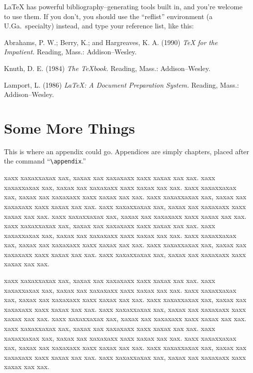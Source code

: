 
LaTeX has powerful bibliography--generating tools built in, and you're 
welcome to use them.  If you don't, you should use the ``reflist'' 
environment (a U.Ga.\ specialty) instead, and type your reference list,
like this:

\begin{reflist}
Abrahams, P. W.; Berry, K.; and Hargreaves, K. A. (1990)
{\em TeX for the Impatient.} Reading, Mass.: Addison--Wesley.

Knuth, D. E. (1984) {\em The TeXbook.} Reading, Mass.: Addison--Wesley.

Lamport, L. (1986) {\em LaTeX: A Document Preparation System.} Reading, 
Mass.: Addison--Wesley.
\end{reflist}


\appendix
\chapter{Some More Things}

This is where an appendix could go. Appendices are simply chapters, 
placed after the command ``\verb"\appendix".''

xaxx xaxaxxaxax xax, xaxax xax xaxaxaxx xaxx xaxax xax xax.
xaxx xaxaxxaxax xax, xaxax xax xaxaxaxx xaxx xaxax xax xax.
xaxx xaxaxxaxax xax, xaxax xax xaxaxaxx xaxx xaxax xax xax.
xaxx xaxaxxaxax xax, xaxax xax xaxaxaxx xaxx xaxax xax xax.
xaxx xaxaxxaxax xax, xaxax xax xaxaxaxx xaxx xaxax xax xax.
xaxx xaxaxxaxax xax, xaxax xax xaxaxaxx xaxx xaxax xax xax.
xaxx xaxaxxaxax xax, xaxax xax xaxaxaxx xaxx xaxax xax xax.
xaxx xaxaxxaxax xax, xaxax xax xaxaxaxx xaxx xaxax xax xax.
xaxx xaxaxxaxax xax, xaxax xax xaxaxaxx xaxx xaxax xax xax.
xaxx xaxaxxaxax xax, xaxax xax xaxaxaxx xaxx xaxax xax xax.
xaxx xaxaxxaxax xax, xaxax xax xaxaxaxx xaxx xaxax xax xax.

xaxx xaxaxxaxax xax, xaxax xax xaxaxaxx xaxx xaxax xax xax.
xaxx xaxaxxaxax xax, xaxax xax xaxaxaxx xaxx xaxax xax xax.
xaxx xaxaxxaxax xax, xaxax xax xaxaxaxx xaxx xaxax xax xax.
xaxx xaxaxxaxax xax, xaxax xax xaxaxaxx xaxx xaxax xax xax.
xaxx xaxaxxaxax xax, xaxax xax xaxaxaxx xaxx xaxax xax xax.
xaxx xaxaxxaxax xax, xaxax xax xaxaxaxx xaxx xaxax xax xax.
xaxx xaxaxxaxax xax, xaxax xax xaxaxaxx xaxx xaxax xax xax.
xaxx xaxaxxaxax xax, xaxax xax xaxaxaxx xaxx xaxax xax xax.
xaxx xaxaxxaxax xax, xaxax xax xaxaxaxx xaxx xaxax xax xax.
xaxx xaxaxxaxax xax, xaxax xax xaxaxaxx xaxx xaxax xax xax.
xaxx xaxaxxaxax xax, xaxax xax xaxaxaxx xaxx xaxax xax xax.


